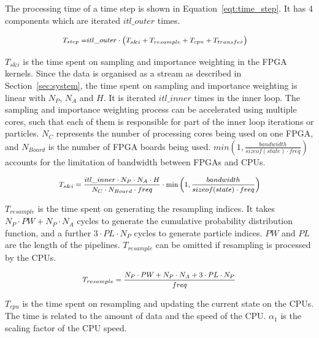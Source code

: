 The processing time of a time step is shown in Equation~\ref{eqt:time_step}.
It has 4 components which are iterated $itl\_outer$ times.

\begin{equation}
\footnotesize
\begin{aligned}
T_{step} = & itl\_outer \cdot \left (T_{s\&i} + T_{resample} + T_{cpu} + T_{transfer} \right)
\end{aligned}
\label{eqt:time_step}
\end{equation}
 
$T_{s\&i}$ is the time spent on sampling and importance weighting in the FPGA kernels.
Since the data is organised as a stream as described in Section~\ref{sec:system}, the time spent on sampling and importance weighting is linear with $N_P$, $N_A$ and $H$.
It is iterated $itl\_inner$ times in the inner loop.
The sampling and importance weighting process can be accelerated using multiple cores, such that each of them is responsible for part of the inner loop iterations or particles.
$N_C$ represents the number of processing cores being used on one FPGA, and $N_{Board}$ is the number of FPGA boards being used.
$min(1,\frac{bandwidth}{sizeof(state) \cdot freq})$ accounts for the limitation of bandwidth between FPGAs and CPUs.

\begin{equation}
\footnotesize
\begin{aligned}
T_{s\&i} = \frac{itl\_inner \cdot N_P \cdot N_A \cdot H}{N_C \cdot N_{Board} \cdot freq} \cdot \min\left(1,\frac{bandwidth}{sizeof(state) \cdot freq}\right)
\end{aligned}
\end{equation}

$T_{resample}$ is the time spent on generating the resampling indices.
It takes $N_P \cdot PW + N_P \cdot N_A$ cycles to generate the cumulative probability distribution function, and a further $3 \cdot PL \cdot N_P$ cycles to generate particle indices.
$PW$ and $PL$ are the length of the pipelines.
$T_{resample}$ can be omitted if resampling is processed by the CPUs.

\begin{equation}
\footnotesize
\begin{aligned}
T_{resample} = \frac{N_P \cdot PW + N_P \cdot N_A + 3 \cdot PL \cdot N_P}{freq}
\end{aligned}
\end{equation}

$T_{cpu}$ is the time spent on resampling and updating the current state on the CPUs.
The time is related to the amount of data and the speed of the CPU.
$\alpha_1$ is the scaling factor of the CPU speed.

